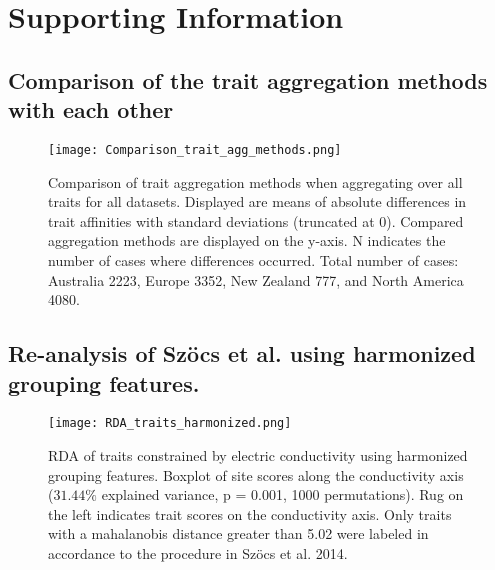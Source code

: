 \documentclass[../Draft_harmonization_paper.tex]{subfiles}
\begin{document}
\section*{Supporting Information}
\label{sec:SI}

\subsection*{Comparison of the trait aggregation methods with each other}
\label{sec:compa_aggr_methods}

\begin{figure}[H]
    \centering
    \texttt{[image: Comparison\_trait\_agg\_methods.png]}
    \caption{Comparison of trait aggregation methods when aggregating over all traits for all datasets. Displayed are means of absolute differences in trait affinities with standard deviations (truncated at 0). Compared aggregation methods are displayed on the y-axis. N indicates the number of cases where differences occurred. Total number of cases: Australia 2223, Europe 3352, New Zealand 777, and North America 4080.}
    \label{fig:comp_aggr_methods}
\end{figure}


\newpage

\subsection*{Re-analysis of Szöcs et al. using harmonized grouping features.}
\label{subsec:SI_szoecs_reanalysis}

\begin{figure}[H]
    \centering
    \texttt{[image: RDA\_traits\_harmonized.png]}
    \caption{RDA of traits constrained by electric conductivity using harmonized grouping features. Boxplot of site scores along the conductivity axis ($31.44 \%$ explained variance, p = 0.001, 1000 permutations). Rug on the left indicates trait scores on the conductivity axis. Only traits with a mahalanobis distance greater than 5.02 were labeled in accordance to the procedure in Szöcs et al. 2014.
    } 
\end{figure}
\end{document}
